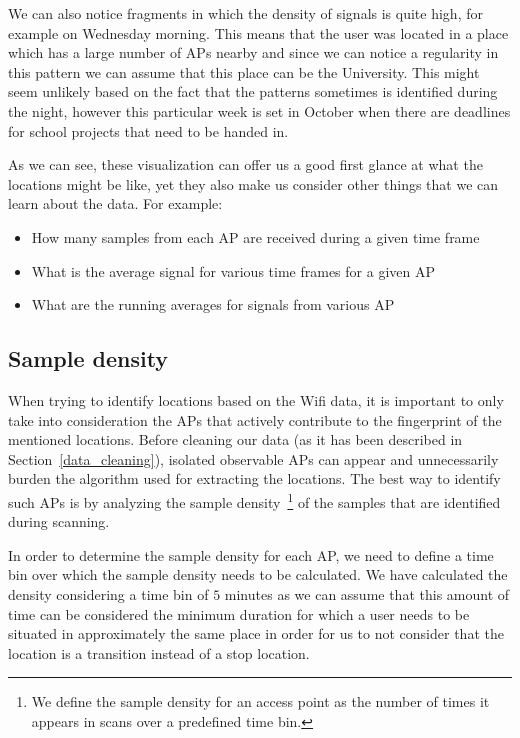 We can also notice fragments in which the density of signals is quite high, for
example on Wednesday morning. This means that the user was located in a place
which has a large number of APs nearby and since we can notice a regularity in
this pattern we can assume that this place can be the University. This might
seem unlikely based on the fact that the patterns sometimes is identified during
the night, however this particular week is set in October when there are
deadlines for school projects that need to be handed in.

As we can see, these visualization can offer us a good first glance at what the
locations might be like, yet they also make us consider other things that we can
learn about the data. For example:
\begin{itemize}
  \item How many samples from each AP are received during a given time frame
  \item What is the average signal for various time frames for a given AP
  \item What are the running averages for signals from various AP
\end{itemize}

\subsection{Sample density}

When trying to identify locations based on the Wifi data, it is important to
only take into consideration the APs that actively contribute to the fingerprint
of the mentioned locations. Before cleaning our data (as it has been described
in Section~\ref{data_cleaning}), isolated observable APs can appear and
unnecessarily burden the algorithm used for extracting the locations.
The best way to identify such APs is by analyzing the sample
density~\footnote{We define the sample density for an access point as the number
of times it appears in scans over a predefined time bin.} of the samples that
are identified during scanning.

In order to determine the sample density for each AP, we need to define a time
bin over which the sample density needs to be calculated. We have calculated the
density considering a time bin of $5$ minutes as we can assume that this amount
of time can be considered the minimum duration for which a user needs to be
situated in approximately the same place in order for us to not consider that
the location is a transition instead of a stop location.

